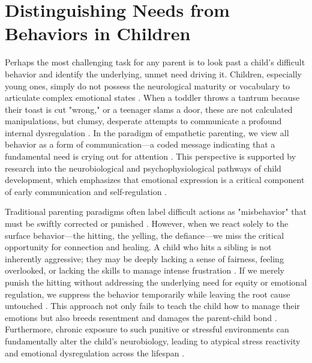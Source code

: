 \section{Distinguishing Needs from Behaviors in Children}

Perhaps the most challenging task for any parent is to look past a child's difficult behavior and identify the underlying, unmet need driving it.
Children, especially young ones, simply do not possess the neurological maturity or vocabulary to articulate complex emotional states \citep{siegel2011, aghaziarati2023, streubel2021}.
When a toddler throws a tantrum because their toast is cut "wrong," or a teenager slams a door, these are not calculated manipulations, but clumsy, desperate attempts to communicate a profound internal dysregulation \citep{gottman1997, christou2025, ruba2020}.
In the paradigm of empathetic parenting, we view all behavior as a form of communication---a coded message indicating that a fundamental need is crying out for attention \citep{rosenberg2003, herman2025, lieberman2007}.
This perspective is supported by research into the neurobiological and psychophysiological pathways of child development, which emphasizes that emotional expression is a critical component of early communication and self-regulation \citep{panksepp1998, schore2001, cassidy1994}.

Traditional parenting paradigms often label difficult actions as "misbehavior" that must be swiftly corrected or punished \citep{kohn2005}.
However, when we react solely to the surface behavior---the hitting, the yelling, the defiance---we miss the critical opportunity for connection and healing.
A child who hits a sibling is not inherently aggressive; they may be deeply lacking a sense of fairness, feeling overlooked, or lacking the skills to manage intense frustration \citep{greene1998, joussemet2008, assor2004}.
If we merely punish the hitting without addressing the underlying need for equity or emotional regulation, we suppress the behavior temporarily while leaving the root cause untouched \citep{dweck2006, soenens2010, cicchetti2016}.
This approach not only fails to teach the child how to manage their emotions but also breeds resentment and damages the parent-child bond \citep{rogers1961}.
Furthermore, chronic exposure to such punitive or stressful environments can fundamentally alter the child's neurobiology, leading to atypical stress reactivity and emotional dysregulation across the lifespan \citep{lupien2009, gunnar2007, meaney2001}.

